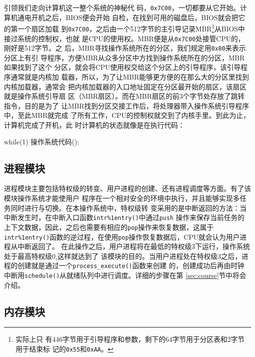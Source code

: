 引领我们走向计算机这一整个系统的神秘代
码，\texttt{0x7C00}，一切都要从它开始。计算机通电开机之后，BIOS便会开始
自检，在找到可用的磁盘后，BIOS就会把它的第一个扇区加载
到\texttt{0x7C00}，之后由一个512字节的主引导记录MBR\footnote{实际上只
  有446字节用于引导程序和参数，剩下的64字节用于分区表和2字节用于结束标
  记的\texttt{0x55}和\texttt{0xAA}。}从BIOS中接过系统的控制权，也就
是CPU的使用权。MBR便是从\texttt{0x7C00}处接管CPU的，刚好是512字节。之
后，MBR寻找操作系统所在的分区，我们规定用\texttt{0x80}来表示分区上有引
导程序，方便MBR从众多分区中方找到操作系统所在的分区，MBR如果找到了这个
分区，就会将CPU使用权交给这个分区上的引导程序，该引导程序通常就是内核加
载器，所以，为了让MBR能够更方便的在那么大的分区里找到内核加载器，通常会
把内核加载器的入口地址固定在分区最开始的扇区，该扇区就是操作系统引导扇
区（MBR扇区）。而在MBR扇区的前3个字节处存放了跳转指令，目的是为了
让MBR找到分区交接工作后，将处理器带入操作系统引导程序中，至此MBR就完成
了所有工作，CPU的控制权就交到了内核手里。到此为止，计算机完成了开机，此
时计算机的状态就像是在执行代码：

\begin{codeblock}
\begin{ccode}
while(1)
{
  操作系统代码();
}
\end{ccode}  
\end{codeblock}


\subsection{进程模块}

进程模块主要包括特权级的转变、用户进程的创建、还有进程调度等方面。有了该模块操作系统才能使用户
程序在一个相对安全的环境中执行，并且能够实现多任务同时进行与切换。在本操作系统中，特权级转
变采用的是中断返回的方法：当中断发生时，在中断入口函数\texttt{intr\%1entry()}中通过\texttt{push}
操作来保存当前任务的上下文数据，因此，之后也需要有相应的\texttt{pop}操作来恢复数据，这属于
\texttt{intr\%1entry()}函数的逆过程，在使用\texttt{pop}操作恢复数据后，CPU就会认为用户进程从中断返回了。
在此操作之后，用户进程将在最低的特权级3下运行，操作系统处于最高特权级0,这样就达到了
该模块的目的。当用户进程处在特权级3之后，进程的创建就是通过一个\texttt{process\_execute()}函数来创建
的，创建成功后再由时钟中断用\texttt{schedule()}从就绪队列中进行调度。详细的步骤在第
\ref{sec:course}节中将会介绍。

\subsection{内存模块}

